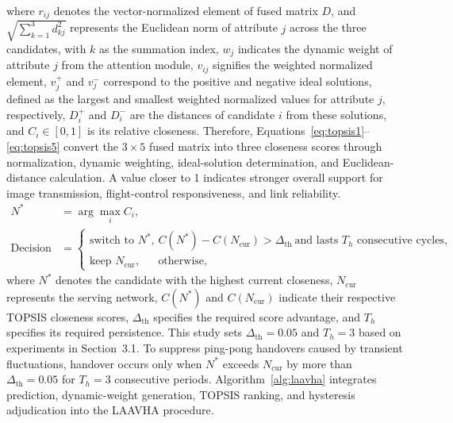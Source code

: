 \documentclass[10pt,a4paper]{article}
\begin{document}
where $r_{ij}$ denotes the vector-normalized element of fused matrix $D$, and $\sqrt{\sum_{k=1}^{3}d_{kj}^{2}}$ represents the Euclidean norm of attribute $j$ across the three candidates, with $k$ as the summation index, $w_j$ indicates the dynamic weight of attribute $j$ from the attention module, $v_{ij}$ signifies the weighted normalized element, $v_j^+$ and $v_j^-$ correspond to the positive and negative ideal solutions, defined as the largest and smallest weighted normalized values for attribute $j$, respectively, $D_i^+$ and $D_i^-$ are the distances of candidate $i$ from these solutions, and $C_i\in[0,1]$ is its relative closeness. Therefore, Equations~\eqref{eq:topsis1}--\eqref{eq:topsis5} convert the $3\times5$ fused matrix into three closeness scores through normalization, dynamic weighting, ideal-solution determination, and Euclidean-distance calculation. A value closer to 1 indicates stronger overall support for image transmission, flight-control responsiveness, and link reliability.
\begin{align}
N^* &= \arg\max_i C_i, \label{eq:select}\\
\mathrm{Decision} &=
\begin{cases}
\text{switch to }N^*, & C(N^*)-C(N_{\mathrm{cur}})>\Delta_{\mathrm{th}}\ \text{and lasts }T_h\text{ consecutive cycles},\\
\text{keep }N_{\mathrm{cur}}, & \text{otherwise},
\end{cases} \label{eq:hysteresis}
\end{align}
where $N^*$ denotes the candidate with the highest current closeness, $N_{\mathrm{cur}}$ represents the serving network, $C(N^*)$ and $C(N_{\mathrm{cur}})$ indicate their respective TOPSIS closeness scores, $\Delta_{\mathrm{th}}$ specifies the required score advantage, and $T_h$ specifies its required persistence. This study sets $\Delta_{\mathrm{th}}=0.05$ and $T_h=3$ based on experiments in Section~3.1. To suppress ping-pong handovers caused by transient fluctuations, handover occurs only when $N^*$ exceeds $N_{\mathrm{cur}}$ by more than $\Delta_{\mathrm{th}}=0.05$ for $T_h=3$ consecutive periods. Algorithm~\ref{alg:laavha} integrates prediction, dynamic-weight generation, TOPSIS ranking, and hysteresis adjudication into the LAAVHA procedure.
\end{document}
